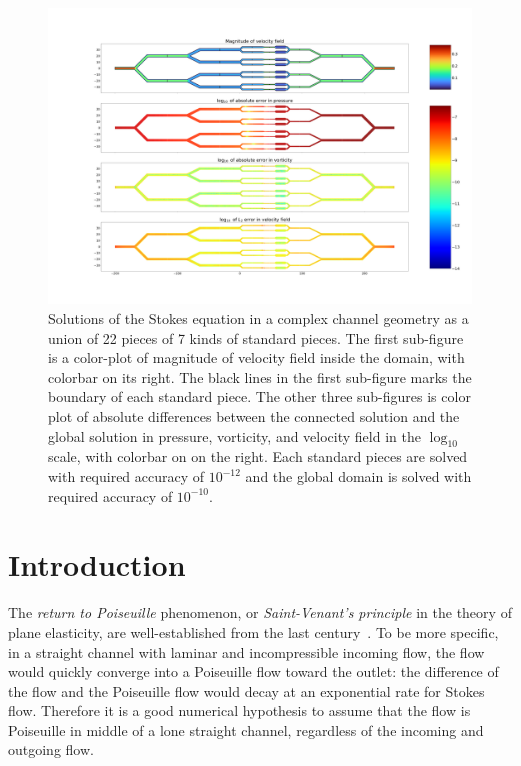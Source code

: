 \documentclass[10pt,twocolumn,letterpaper]{article}
\begin{document}
\begin{figure}[t]
  \centering
  \includegraphics[width=\textwidth]{pic/connection-error-rough.png}
  \caption{
    Solutions of the Stokes equation in a complex channel geometry 
    as a union of 22 pieces of 7 kinds of standard pieces.
    The first sub-figure is a color-plot of magnitude of velocity field inside the
    domain, with colorbar on its right. The black lines in the
    first sub-figure marks the boundary of each standard piece.
    The other three sub-figures is color plot of absolute differences
    between the connected solution and the global solution in pressure,
    vorticity, and velocity field in the $\log_{10}$ scale, with colorbar on on the right. 
    Each standard pieces are solved
    with required accuracy of $10^{-12}$ and the global domain is solved with
    required accuracy of $10^{-10}$.}\label{fig:connection-error}

\end{figure}

\section{Introduction}

The \textit{return to Poiseuille} phenomenon, or \textit{Saint-Venant's
  principle} in the theory of plane elasticity, are well-established from the
last century~\cite{coRecentDevelopmentsConcerning1983,gregoryTractionBoundaryValue1980,horganDECAYESTIMATESBIHARMONIC1989}.
To be more specific, in a straight channel with laminar and incompressible
incoming flow, the flow would quickly converge into a Poiseuille flow toward
the outlet: the difference of the flow and the Poiseuille flow would decay at
an exponential rate for Stokes flow. Therefore it is a good numerical
hypothesis to assume that the flow is Poiseuille in middle of a lone straight
channel, regardless of the incoming and outgoing flow.
\end{document}
